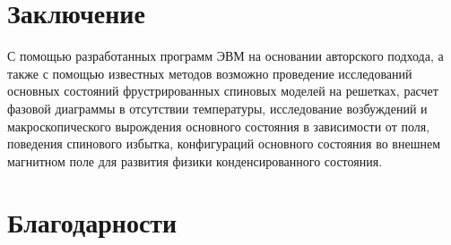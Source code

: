 \documentclass[utf8, babel, sor, jor, amsmath, amssymb, reprint]{elsarticle} %
\begin{document}
\section{Заключение}

С помощью разработанных программ ЭВМ на основании авторского подхода, а также с помощью известных методов возможно проведение исследований основных состояний фрустрированных спиновых моделей на решетках, расчет фазовой диаграммы в отсутствии температуры, исследование возбуждений и макроскопического вырождения основного состояния в зависимости от поля, поведения спинового избытка, конфигураций основного состояния во внешнем магнитном поле для развития физики конденсированного состояния.


\section{Благодарности}

 


\end{document}
